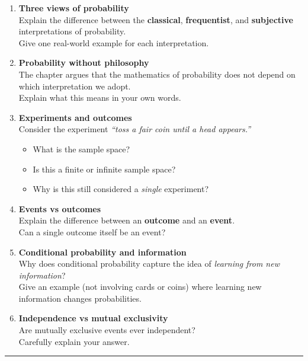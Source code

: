 \documentclass[
  letterpaper,
  DIV=11,
  numbers=noendperiod]{scrreprt}
\providecommand{\tightlist}{%
  \setlength{\itemsep}{0pt}\setlength{\parskip}{0pt}}
\begin{document}
\begin{enumerate}
\def\labelenumi{\arabic{enumi}.}
\item
  \textbf{Three views of probability}\\
  Explain the difference between the \textbf{classical},
  \textbf{frequentist}, and \textbf{subjective} interpretations of
  probability.\\
  Give one real-world example for each interpretation.
\item
  \textbf{Probability without philosophy}\\
  The chapter argues that the mathematics of probability does not depend
  on which interpretation we adopt.\\
  Explain what this means in your own words.
\item
  \textbf{Experiments and outcomes}\\
  Consider the experiment \emph{``toss a fair coin until a head
  appears.''}

  \begin{itemize}
  \tightlist
  \item
    What is the sample space?\\
  \item
    Is this a finite or infinite sample space?\\
  \item
    Why is this still considered a \emph{single} experiment?
  \end{itemize}
\item
  \textbf{Events vs outcomes}\\
  Explain the difference between an \textbf{outcome} and an
  \textbf{event}.\\
  Can a single outcome itself be an event?
\item
  \textbf{Conditional probability and information}\\
  Why does conditional probability capture the idea of \emph{learning
  from new information}?\\
  Give an example (not involving cards or coins) where learning new
  information changes probabilities.
\item
  \textbf{Independence vs mutual exclusivity}\\
  Are mutually exclusive events ever independent?\\
  Carefully explain your answer.
\end{enumerate}

\begin{center}\rule{0.5\linewidth}{0.5pt}\end{center}
\end{document}
